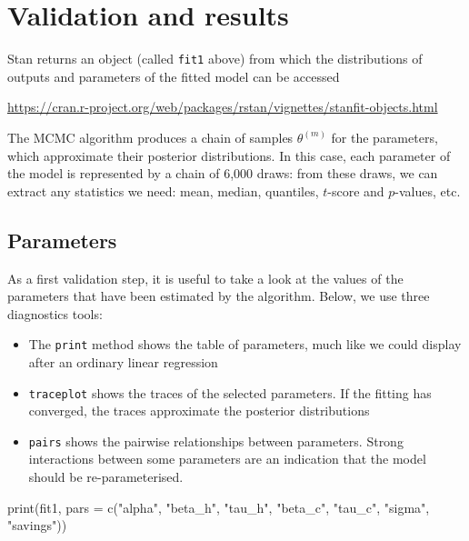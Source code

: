 \documentclass[
]{article}
\newenvironment{Shaded}{\begin{snugshade}}{\end{snugshade}}
\newcommand{\AttributeTok}[1]{\textcolor[rgb]{0.77,0.63,0.00}{#1}}
\newcommand{\FunctionTok}[1]{\textcolor[rgb]{0.00,0.00,0.00}{#1}}
\newcommand{\NormalTok}[1]{#1}
\newcommand{\StringTok}[1]{\textcolor[rgb]{0.31,0.60,0.02}{#1}}
\providecommand{\tightlist}{%
  \setlength{\itemsep}{0pt}\setlength{\parskip}{0pt}}
\begin{document}
\hypertarget{validation-and-results}{%
\section{Validation and results}\label{validation-and-results}}

Stan returns an object (called \texttt{fit1} above) from which the distributions of outputs and parameters of the fitted model can be accessed

\url{https://cran.r-project.org/web/packages/rstan/vignettes/stanfit-objects.html}

The MCMC algorithm produces a chain of samples \(\theta^{(m)}\) for the parameters, which approximate their posterior distributions. In this case, each parameter of the model is represented by a chain of 6,000 draws: from these draws, we can extract any statistics we need: mean, median, quantiles, \(t\)-score and \(p\)-values, etc.

\hypertarget{parameters}{%
\subsection{Parameters}\label{parameters}}

As a first validation step, it is useful to take a look at the values of the parameters that have been estimated by the algorithm. Below, we use three diagnostics tools:

\begin{itemize}
\tightlist
\item
  The \texttt{print} method shows the table of parameters, much like we could display after an ordinary linear regression
\item
  \texttt{traceplot} shows the traces of the selected parameters. If the fitting has converged, the traces approximate the posterior distributions
\item
  \texttt{pairs} shows the pairwise relationships between parameters. Strong interactions between some parameters are an indication that the model should be re-parameterised.
\end{itemize}

\begin{Shaded}
\begin{Highlighting}[]
\FunctionTok{print}\NormalTok{(fit1, }\AttributeTok{pars =} \FunctionTok{c}\NormalTok{(}\StringTok{"alpha"}\NormalTok{, }\StringTok{"beta\_h"}\NormalTok{, }\StringTok{"tau\_h"}\NormalTok{, }\StringTok{"beta\_c"}\NormalTok{, }\StringTok{"tau\_c"}\NormalTok{, }\StringTok{"sigma"}\NormalTok{, }\StringTok{"savings"}\NormalTok{))}
\end{Highlighting}
\end{Shaded}
\end{document}
